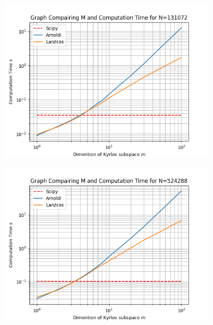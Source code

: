 \documentclass{article}
\begin{document}
\begin{figure}[H]
    \centering
    \begin{minipage}{0.5\textwidth}
       \centering
	  \includegraphics[width=\linewidth]{Plots/M v Comp Time Results for N=131072.png}
	  \label{fig:MEe7}
    \end{minipage}\hfill
    \begin{minipage}{0.5\textwidth}
       \centering
	  \includegraphics[width=\linewidth]{Plots/M v Comp Time Results for N=524288.png}
	  \label{fig:MEe6}
    \end{minipage}
\end{figure}
\end{document}

